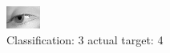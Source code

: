\begin{figure}[h!]
\begin{center}
\includegraphics[width=0.60\columnwidth]{figures/ID2909_class_3_target_4.png}
\end{center}
\caption{ Classification: 3 actual target: 4}
\label{fig:ID2909_class_3_target_4}
\end{figure}
